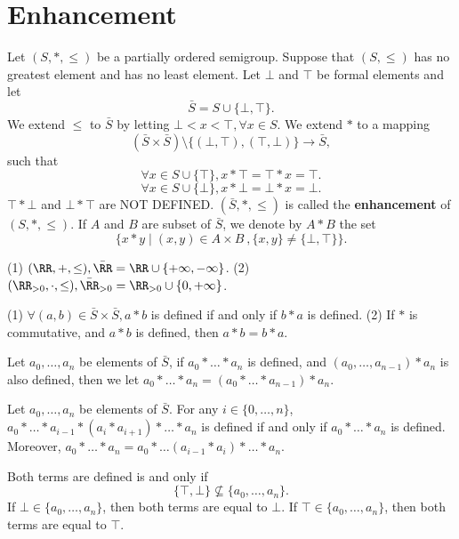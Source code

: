 \section{Enhancement}
\begin{definitionenv}
    Let $(S,*,\le)$ be a partially ordered semigroup. Suppose that $(S,\le )$ has no greatest element and has no least element. Let $\bot$ and $\top$ be formal elements and let 
    $$\bar{S}=S\cup\{\bot,\top\}.$$
    We extend $\le $ to $\bar{S}$ by letting $\bot<x<\top,\forall x\in S$. We extend $*$ to a mapping
    $$\left(\bar{S}\times\bar{S}\right)\setminus \{(\bot,\top),(\top,\bot)\}\longrightarrow \bar{S},$$
    such that 
    $$\forall x\in S\cup\{\top\},x*\top=\top*x=\top.$$
    $$\forall x\in S\cup\{\bot\},x*\bot=\bot*x=\bot.$$
    $\top*\bot$ and $\bot*\top$ are NOT DEFINED. $(\bar{S},*,\le)$ is called the \textbf{enhancement} of $(S,*,\le)$. If $A$ and $B$ are subset of $\bar{S}$, we denote by $A*B$ the set 
    $$\{x*y\mid (x,y)\in A\times B\ ,\{x,y\}\not=\{\bot,\top\}\}.$$
\end{definitionenv}
\begin{exampleenv}
    \quad 
    \newline
    (1) $(\RR,+,\le ), \bar{\RR}=\RR\cup\{+\infty,-\infty\}$.
    \newline
    (2) $(\RR_{>0},\cdot,\le),\bar{\RR}_{>0}=\RR_{>0}\cup\{0,+\infty\}$.
\end{exampleenv}
\begin{remark}
    \quad 
    \newline
    (1) $\forall (a,b)\in \bar{S}\times \bar{S}, a*b$ is defined if and only if $b*a$ is defined. 
    \newline
    (2) If $*$ is commutative, and $a*b$ is defined, then $a*b=b*a$.
\end{remark}
\begin{definitionenv}
    Let $a_0,\dots,a_n$ be elements of $\bar{S}$, if $a_0*\dots*a_n$ is defined, and $(a_0,\dots,a_{n-1})*a_n$ is also defined, then we let $a_0*\dots*a_n=\left(a_0*\dots*a_{n-1}\right)*a_n$.
\end{definitionenv}
\begin{propositionenv}
    Let $a_0,\dots,a_n$ be elements of $\bar{S}$. For any $i\in \{0,\dots,n\}$, $a_0*\dots*a_{i-1}*(a_i*a_{i+1})*\dots*a_n$ is defined if and only if $a_0*\dots*a_n$ is defined. Moreover, $a_0*\dots*a_n=a_0*\dots (a_{i-1}*a_i)*\dots*a_n $.
\end{propositionenv}
\begin{proofenv}
    Both terms are defined is and only if 
    $$\{\top,\bot\}\nsubseteq\{a_0,\dots,a_n\}.$$
    If $\bot\in\{a_0,\dots,a_n\}$, then both terms are equal to $\bot$. If $\top\in\{a_0,\dots,a_n\}$, then both terms are equal to $\top$. 
\end{proofenv}
